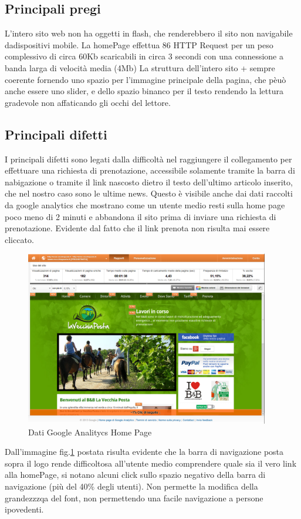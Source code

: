 \documentclass[a4paper,12pt,hidelinks]{report}
\begin{document}
\subsection{Principali pregi}
L'intero sito web non ha oggetti in flash, che renderebbero il sito non navigabile dadispositivi mobile.
La homePage effettua 86 HTTP Request per un peso complessivo di circa 60Kb scaricabili in circa 3 secondi con una connessione a banda larga di velocità media (4Mb)
La struttura dell'intero sito + sempre coerente fornendo uno spazio per l'immagine principale della pagina, che pèuò anche essere uno slider, e dello spazio binanco per il testo rendendo la lettura gradevole
non affaticando gli occhi del lettore.
\subsection{Principali difetti}
I principali difetti sono legati dalla difficoltà nel raggiungere il collegamento per effettuare una richiesta di prenotazione, accessibile solamente tramite la barra di nabigazione o
tramite il link nascosto dietro il testo dell'ultimo articolo inserito, che nel nostro caso sono le ultime news. Questo è visibile anche dai dati raccolti da google analytics che mostrano come un utente medio
resti sulla home page poco meno di 2 minuti e abbandona il sito prima di inviare una richiesta di prenotazione. Evidente dal fatto che il link prenota non risulta mai essere cliccato.

\begin{figure}[h!]%
	\includegraphics[width=0.95\textwidth,keepaspectratio=true]{img/googleAnalyticsDoc1}
	\centering
	\caption{Dati Google Analitycs Home Page}%
	\label{fig:googleHomePage}%
\end{figure}
Dall'immagine {fig.\ref{fig:googleHomePage}} postata risulta evidente che la barra di navigazione posta sopra il logo rende difficoltosa all'utente medio comprendere quale sia il vero link alla homePage, si notano alcuni click sullo spazio negativo della
barra di navigazione (più del 40\% degli utenti).
Non permette la modifica della grandezzzqa del font, non permettendo una facile navigazione a persone ipovedenti.
\end{document}
